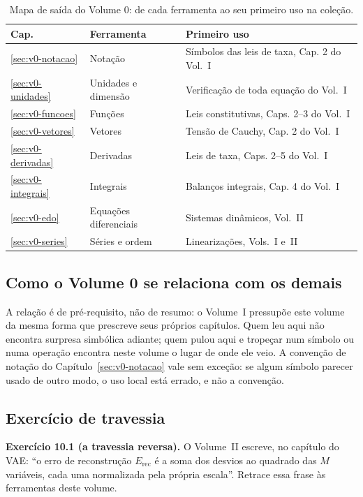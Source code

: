 \documentclass[12pt,a4paper]{article}
\numberwithin{equation}{section}
\numberwithin{table}{section}
\numberwithin{figure}{section}
\begin{document}
\begin{table}[H]
\centering
\caption[Ferramentas do Volume 0 e seu primeiro uso nos volumes seguintes.]{%
Mapa de saída do Volume 0: de cada ferramenta ao seu primeiro uso na
coleção.}
\label{tab:v0-c10-1}
\begin{tabularx}{\textwidth}{lXl}
\toprule
\textbf{Cap.} & \textbf{Ferramenta} & \textbf{Primeiro uso} \\
\midrule
\ref{sec:v0-notacao} & Notação & Símbolos das leis de taxa, Cap. 2 do Vol.~I \\
\ref{sec:v0-unidades} & Unidades e dimensão & Verificação de toda equação do Vol.~I \\
\ref{sec:v0-funcoes} & Funções & Leis constitutivas, Caps. 2--3 do Vol.~I \\
\ref{sec:v0-vetores} & Vetores & Tensão de Cauchy, Cap. 2 do Vol.~I \\
\ref{sec:v0-derivadas} & Derivadas & Leis de taxa, Caps. 2--5 do Vol.~I \\
\ref{sec:v0-integrais} & Integrais & Balanços integrais, Cap. 4 do Vol.~I \\
\ref{sec:v0-edo} & Equações diferenciais & Sistemas dinâmicos, Vol.~II \\
\ref{sec:v0-series} & Séries e ordem & Linearizações, Vols.~I e~II \\
\bottomrule
\end{tabularx}
\end{table}

\subsection{Como o Volume 0 se relaciona com os demais}

A relação é de pré-requisito, não de resumo: o Volume~I pressupõe este
volume da mesma forma que prescreve seus próprios capítulos. Quem leu
aqui não encontra surpresa simbólica adiante; quem pulou aqui e tropeçar
num símbolo ou numa operação encontra neste volume o lugar de onde ele
veio. A convenção de notação do Capítulo~\ref{sec:v0-notacao} vale sem
exceção: se algum símbolo parecer usado de outro modo, o uso local está
errado, e não a convenção.

\subsection{Exercício de travessia}

\textbf{Exercício 10.1 (a travessia reversa).} O Volume~II escreve, no capítulo do
VAE: ``o erro de reconstrução $E_{\text{rec}}$ é a soma dos desvios ao
quadrado das $M$ variáveis, cada uma normalizada pela própria escala''.
Retrace essa frase às ferramentas deste volume.
\end{document}
